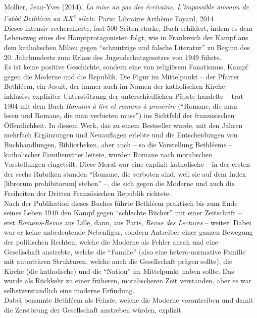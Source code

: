 \documentclass[a4paper,
fontsize=11pt,
oneside,
numbers=noperiodatend,
parskip=half-,
bibliography=totoc,
final
]{scrartcl}
\begin{document}
Mollier, Jean-Yves (2014). \emph{La mise au pas des écrivains.
L'impossible mission de l'abbé Bethléem au XX\textsuperscript{e}
siècle}. Paris: Librairie Arthème Fayard, 2014\\
Dieses intensiv recherchierte, fast 500 Seiten starke, Buch schildert,
indem es dem Lebensweg eines des Hauptprotagonisten folgt, wie in
Frankreich der Kampf aus dem katholischen Milieu gegen ``schmutzige und
falsche Literatur'' zu Beginn des 20. Jahrhunderts zum Erlass des
Jugendschutzgesetzes von 1949 führte.\\
Es ist keine positive Geschichte, sondern eine von religiösem
Fanatismus, Kampf gegen die Moderne und die Republik. Die Figur im
Mittelpunkt -- der Pfarrer Bethléem, ein Jesuit, der immer auch im Namen
der katholischen Kirche inklusive expliziter Unterstützung der
unterschiedlichen Päpste handelte -- trat 1904 mit dem Buch \emph{Romans
à lire et romans à proscrire} (``Romane, die man lesen und Romane, die
man verbieten muss'') ins Sichtfeld der französischen Öffentlichkeit. In
diesem Werk, das zu einem Bestseller wurde, mit den Jahren mehrfach
Ergänzungen und Neuauflagen erlebte und die Entscheidungen von
Buchhandlungen, Bibliotheken, aber auch -- so die Vorstellung Bethléems
-- katholischer Familienväter leitete, wurden Romane nach moralischen
Vorstellungen eingeteilt. Diese Moral war eine explizit katholische --
in der ersten der sechs Rubriken standen ``Romane, die verboten sind,
weil sie auf dem Index {[}librorum prohibitorum{]} stehen'' --, die sich
gegen die Moderne und auch die Freiheiten der Dritten Französischen
Republik richtete.\\
Nach der Publikation dieses Buches führte Bethléem praktisch bis zum
Ende seines Leben 1940 den Kampf gegen ``schlechte Bücher'' mit einer
Zeitschrift -- erst \emph{Romans-Revue} aus Lille, dann, aus Paris,
\emph{Revue des Lectures} -- weiter. Dabei war er keine unbedeutende
Nebenfigur, sondern Antreiber einer ganzen Bewegung der politischen
Rechten, welche die Moderne als Fehler ansah und eine Gesellschaft
anstrebte, welche die ``Familie'' (also eine hetero-normative Familie
mit autoritären Strukturen, welche auch die Gesellschaft prägen sollte),
die Kirche (die katholische) und die ``Nation'' im Mittelpunkt haben
sollte. Das wurde als Rückkehr zu einer früheren, moralischeren Zeit
verstanden, aber es war selbstverständlich eine moderne Erfindung.\\
Dabei benannte Bethléem als Feinde, welche die Moderne vorantreiben und
damit die Zerstörung der Gesellschaft anstreben würden, explizit
\end{document}
